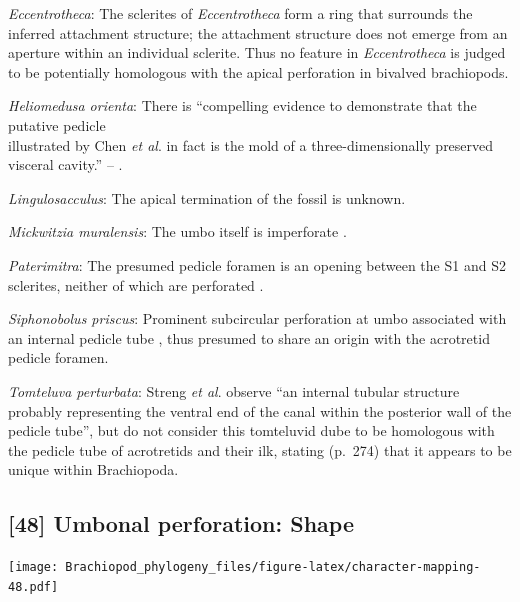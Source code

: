 \documentclass[openany]{book}
\theoremstyle{definition}
\theoremstyle{definition}
\theoremstyle{definition}
\theoremstyle{remark}
\begin{document}
\hypertarget{Eccentrotheca-coding-47}{}
\emph{Eccentrotheca}: The sclerites of \emph{Eccentrotheca} form a ring
that surrounds the inferred attachment structure; the attachment
structure does not emerge from an aperture within an individual
sclerite. Thus no feature in \emph{Eccentrotheca} is judged to be
potentially homologous with the apical perforation in bivalved
brachiopods.

\hypertarget{Heliomedusa_orienta-coding-47}{}
\emph{Heliomedusa orienta}: There is ``compelling evidence to
demonstrate that the putative pedicle\\
illustrated by Chen \emph{et al}. \citeyearpar[Figs. 4, 6,
7]{Chen2007Reinterpretationof} in fact is the mold of a
three-dimensionally preserved visceral cavity.'' --
\citet{Zhang2009Architectureand}.

\hypertarget{Lingulosacculus-coding-47}{}
\emph{Lingulosacculus}: The apical termination of the fossil is unknown.

\hypertarget{Mickwitzia_muralensis-coding-47}{}
\emph{Mickwitzia muralensis}: The umbo itself is imperforate
\citep{Balthasar2004Shellstructure}.

\hypertarget{Paterimitra-coding-47}{}
\emph{Paterimitra}: The presumed pedicle foramen is an opening between
the S1 and S2 sclerites, neither of which are perforated
\citep{Skovsted2009Thescleritome}.

\hypertarget{Siphonobolus_priscus-coding-47}{}
\emph{Siphonobolus priscus}: Prominent subcircular perforation at umbo
associated with an internal pedicle tube \citep{Popov2009Earlyontogeny},
thus presumed to share an origin with the acrotretid pedicle foramen.

\hypertarget{Tomteluva_perturbata-coding-47}{}
\emph{Tomteluva perturbata}: Streng \emph{et al}.
\citeyearpar{Streng2016Anew} observe ``an internal tubular structure
probably representing the ventral end of the canal within the posterior
wall of the pedicle tube'', but do not consider this tomteluvid dube to
be homologous with the pedicle tube of acrotretids and their ilk,
stating (p.~274) that it appears to be unique within Brachiopoda.

\subsection*{{[}48{]} Umbonal perforation:
Shape}\label{umbonal-perforation-shape}

\texttt{[image: Brachiopod\_phylogeny\_files/figure-latex/character-mapping-48.pdf]}
\end{document}
